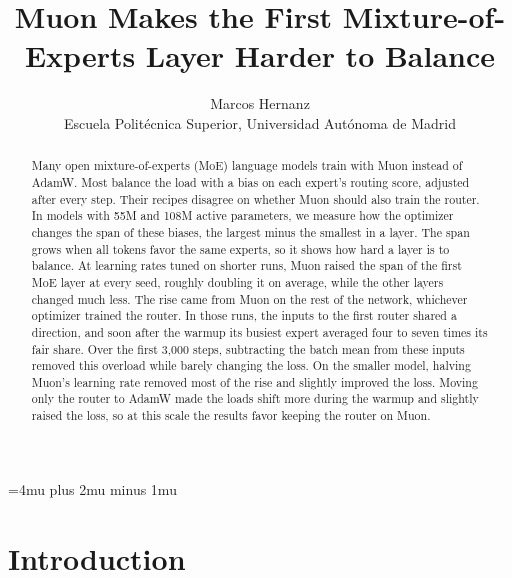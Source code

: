 \documentclass[11pt, a4paper]{article}
\title{Muon Makes the First Mixture-of-Experts Layer Harder to Balance}
\author{Marcos Hernanz\\[2pt]{\normalsize Escuela Politécnica Superior, Universidad Autónoma de Madrid}}
\begin{document}
\medmuskip=4mu plus 2mu minus 1mu\relax
{}

\maketitle
\begin{NoHyper}{\setlength{\footnotemargin}{0pt}\renewcommand{\thefootnote}{}}\end{NoHyper}

\begin{abstract}
  Many open mixture-of-experts (MoE) language models train with Muon instead of AdamW\@. Most balance the load with a bias on each expert's routing score, adjusted after every step. Their recipes disagree on whether Muon should also train the router. In models with 55M and 108M active parameters, we measure how the optimizer changes the span of these biases, the largest minus the smallest in a layer. The span grows when all tokens favor the same experts, so it shows how hard a layer is to balance. At learning rates tuned on shorter runs, Muon raised the span of the first MoE layer at every seed, roughly doubling it on average, while the other layers changed much less. The rise came from Muon on the rest of the network, whichever optimizer trained the router. In those runs, the inputs to the first router shared a direction, and soon after the warmup its busiest expert averaged four to seven times its fair share. Over the first 3,000 steps, subtracting the batch mean from these inputs removed this overload while barely changing the loss. On the smaller model, halving Muon's learning rate removed most of the rise and slightly improved the loss. Moving only the router to AdamW made the loads shift more during the warmup and slightly raised the loss, so at this scale the results favor keeping the router on Muon.
\end{abstract}

\tableofcontents

\section{Introduction}
\label{sec:introduction}
\end{document}
